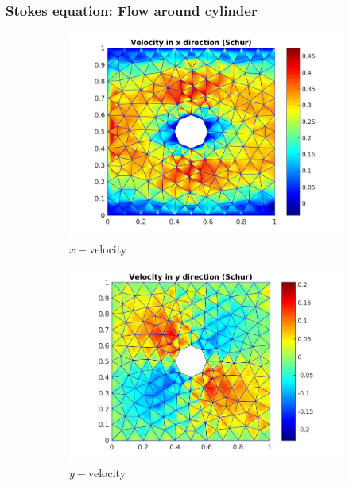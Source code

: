 \documentclass{beamer}
\begin{document}
\begin{frame}
\frametitle{Stokes equation: Flow around cylinder}
\begin{figure}
\begin{subfigure}{0.3\textwidth}	
    \includegraphics[width=\linewidth]{cylinder_schur_vx.jpg}
    \caption{$x-$velocity}
    \label{x_vel_stoke_schur}
\end{subfigure}
\begin{subfigure}{0.3\textwidth}	
    \includegraphics[width=\linewidth]{cylinder_schur_vy.jpg}
    \caption{$y-$velocity}
     \label{y_vel_stoke_schur}
\end{subfigure}
\begin{subfigure}{0.3\textwidth}	

\end{subfigure}
\end{figure}
\end{frame}
\end{document}
